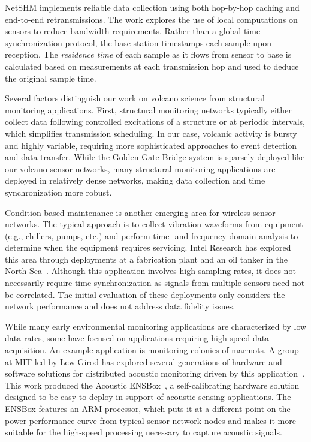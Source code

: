 NetSHM implements reliable data collection using both hop-by-hop caching and
end-to-end retransmissions. The work explores the use of local computations
on sensors to reduce bandwidth requirements. Rather than a global
time synchronization protocol, the base station timestamps each sample upon
reception. The \textit{residence time} of each sample as it flows from sensor
to base is calculated based on measurements at each transmission hop and used
to deduce the original sample time.

Several factors distinguish our work on volcano science from structural
monitoring applications. First, structural monitoring networks typically
either collect data following controlled excitations of a structure or at
periodic intervals, which simplifies transmission scheduling. In our case,
volcanic activity is bursty and highly variable, requiring more sophisticated
approaches to event detection and data transfer. While the Golden Gate Bridge
system is sparsely deployed like our volcano sensor networks, many structural
monitoring applications are deployed in relatively dense networks, making
data collection and time synchronization more robust. 

Condition-based maintenance is another emerging area for wireless sensor
networks. The typical approach is to collect vibration waveforms from
equipment (e.g., chillers, pumps, etc.) and perform time- and
frequency-domain analysis to determine when the equipment requires servicing.
Intel Research has explored this area through deployments at a fabrication
plant and an oil tanker in the North Sea~\cite{intel-northseasensys}.
Although this application involves high sampling rates, it does not
necessarily require time synchronization as signals from multiple sensors
need not be correlated. The initial evaluation of these deployments only
considers the network performance and does not address data fidelity issues.

While many early environmental monitoring applications are characterized by
low data rates, some have focused on applications requiring high-speed data
acquisition. An example application is monitoring colonies of marmots. A
group at MIT led by Lew Girod has explored several generations of hardware
and software solutions for distributed acoustic monitoring driven by this
application~\cite{girod-marmots}. This work produced the Acoustic
ENSBox~\cite{girod-ensbox}, a self-calibrating hardware solution designed to
be easy to deploy in support of acoustic sensing applications. The ENSBox
features an ARM processor, which puts it at a different point on the
power-performance curve from typical sensor network nodes and makes it more
suitable for the high-speed processing necessary to capture acoustic signals.

